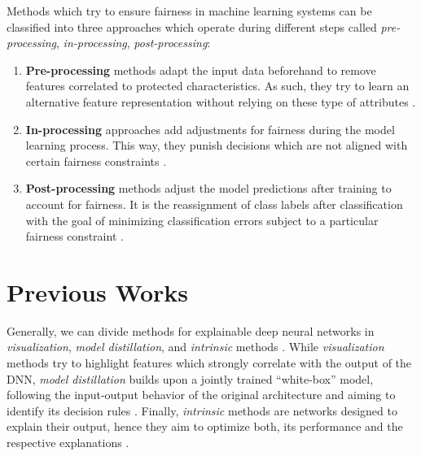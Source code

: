 Methods which try to ensure fairness in machine learning systems can be classified into three approaches which operate during different steps called \emph{pre-processing}, \emph{in-processing}, \emph{post-processing}:
\begin{enumerate}
    \item \textbf{Pre-processing} methods adapt the input data beforehand to remove features correlated to protected characteristics. As such, they try to learn an alternative feature representation without relying on these type of attributes \citep{GordalizaBGL19, CalmonWVRV17, LouizosSLWZ15, ZemelWSPD13}. 
    \item \textbf{In-processing} approaches add adjustments for fairness during the model learning process. This way, they punish decisions which are not aligned with certain fairness constraints \citep{DworkIKL18, DoniniOBSP18, AgarwalBD0W18}.
    \item \textbf{Post-processing} methods adjust the model predictions after training to account for fairness. It is the reassignment of class labels after classification with the goal of minimizing 
    classification errors subject to a particular fairness constraint \citep{HardtPNS16,PleissRWKW17, FeldmanFMSV15}.
\end{enumerate}


\section{Previous Works}



 
 Generally, we can divide methods for explainable deep neural networks in \emph{visualization}, \emph{model distillation}, and \emph{intrinsic} methods \citep{xie2020explainable}. While \emph{visualization} methods try to highlight features which strongly correlate with the output of the DNN, \emph{model distillation} builds upon a jointly trained ``white-box'' model, following the input-output behavior of the original architecture and aiming to identify its decision rules \citep{xie2020explainable}. Finally, \emph{intrinsic} methods are networks designed to explain their output, hence they aim to optimize both, its performance and the respective explanations \citep{xie2020explainable}.

